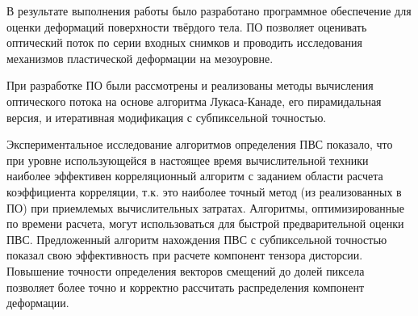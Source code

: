 \setcounter{figure}{0}

В результате выполнения работы было разработано программное обеспечение для оценки деформаций поверхности твёрдого тела.  ПО позволяет оценивать оптический поток по серии входных снимков и проводить исследования механизмов пластической деформации на мезоуровне. %

При разработке ПО были рассмотрены и реализованы методы вычисления оптического потока на основе алгоритма Лукаса-Канаде, его пирамидальная версия, и итеративная модификация с субпиксельной точностью.

Экспериментальное исследование алгоритмов определения ПВС показало, что при уровне использующейся в настоящее время вычислительной техники наиболее эффективен корреляционный алгоритм с заданием области расчета коэффициента корреляции, т.к. это наиболее точный метод (из реализованных в ПО) при приемлемых вычислительных затратах. Алгоритмы, оптимизированные по времени расчета, могут использоваться для быстрой предварительной оценки ПВС.
Предложенный алгоритм нахождения ПВС с субпиксельной точностью показал свою эффективность при расчете компонент тензора дисторсии. Повышение точности определения векторов смещений до долей пиксела позволяет более точно и корректно рассчитать распределения компонент деформации.